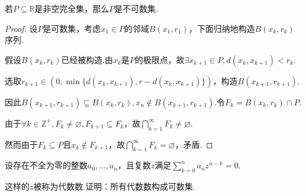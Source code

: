 \begin{comment}
    \begin{theorem}\label{br2.37}
        紧集\(K\)的无限子集\(E\)在\(K\)中必有极限点.
    \end{theorem}

    \begin{proof}
        设\(E\)在\(K\)中没有极限点，故\(\forall x \in E, \exists r_x>0, B(x,r_x) \cap E=\{x\}\).

        选择一个开集\(G\)满足\(K \setminus \bigcup_{x \in E} B(x,r_x) \subseteq G\)，从而\(\{B(x,r_x)\}_{x \in E}, G\)构成一组开覆盖.

        由于\(\forall x \in E, \exists r_x>0, B(x,r_x) \cap E=\{x\}\)，故\(x_0 \notin \bigcup_{x \in E \setminus \{x_0\}} B(x,r_x) \cup G\).

        因此\(K\)没有一个\(\{B(x,r_x)\}_{x \in E}, G\)的有限子覆盖，与\(K\)的紧性矛盾.
    \end{proof}
\end{comment}


\begin{theorem}\label{br2.43}
    若\(P \subseteq \mathbb{R}\)是非空完全集，那么\(P\)是不可数集.
\end{theorem}

\begin{proof}
    设\(P\)是可数集，考虑\(x_1 \in P\)的邻域\(B(x_1,r_1)\)，下面{\kaishu 归纳地构造\(B(x_k,r_k)\)序列}.
    
    假设\(B(x_k,r_k)\)已经被构造.由\(x_k\)是\(P\)的极限点，故\(\exists x_{k+1} \in P, d(x_k,x_{k+1})<r_k\).

    选取\(r_{k+1} \in (0,\min\{d(x_k,x_{k+1}), r-d(x_k,x_{k+1})\})\)，构造\(B(x_{k+1},r_{k+1})\).
    
    因此\(\overline{B}(x_{k+1},r_{k+1}) \subseteq B(x_k,r_k), x_n \notin \overline{B}(x_{k+1},r_{k+1})\).令\(F_k=B(x_k,r_k) \cap P\).

    由于\(\forall k \in \mathbb{Z}^+, F_k \ne \varnothing, F_{k+1} \subseteq F_k\)，故\(\bigcap_{k=1}^\infty F_k \ne \varnothing\).

    然而由于\(F_k \subseteq P\)且\(x_k \notin F_{k+1}\)，故\(\bigcap_{k=1}^\infty F_k=\varnothing\)，矛盾.
\end{proof}

\begin{problem}[2]\label{1.B.2}
    设存在不全为零的整数\(a_0, \dots, a_n\)，且复数\(z\)满足\(\sum_{k=0}^n a_n z^{n-k}=0\).

    这样的\(z\)被称为代数数.证明：所有代数数构成可数集.
\end{problem}

